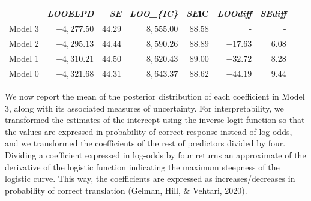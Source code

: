 \documentclass[
  english,
  man,floatsintext]{apa6}
\begin{document}
\captionsetup[table]{labelformat=empty,skip=1pt}
\begin{longtable}{lrrrrrr}
\toprule
 & \emph{\textbf{LOOELPD}} & \emph{\textbf{SE}} & \emph{\textbf{LOO\_\{IC\}}} & \textbf{\emph{SE}IC} & \emph{\textbf{LOOdiff}} & \emph{\textbf{SEdiff}} \\ 
\midrule
Model 3 & $-4,277.50$ & $44.29$ & $8,555.00$ & $88.58$ & - & - \\ 
Model 2 & $-4,295.13$ & $44.44$ & $8,590.26$ & $88.89$ & $-17.63$ & $6.08$ \\ 
Model 1 & $-4,310.21$ & $44.50$ & $8,620.43$ & $89.00$ & $-32.72$ & $8.28$ \\ 
Model 0 & $-4,321.68$ & $44.31$ & $8,643.37$ & $88.62$ & $-44.19$ & $9.44$ \\ 
 \bottomrule
\end{longtable}

We now report the mean of the posterior distribution of each coefficient in Model 3, along with its associated measures of uncertainty. For interpretability, we transformed the estimates of the intercept using the inverse logit function so that the values are expressed in probability of correct response instead of log-odds, and we transformed the coefficients of the rest of predictors divided by four. Dividing a coefficient expressed in log-odds by four returns an approximate of the derivative of the logistic function indicating the maximum steepness of the logistic curve. This way, the coefficients are expressed as increases/decreases in probability of correct translation (Gelman, Hill, \& Vehtari, 2020).
\end{document}
